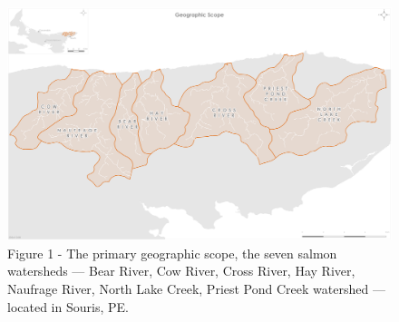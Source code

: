 \documentclass[
  letterpaper,
  DIV=11,
  numbers=noendperiod]{scrreprt}
\begin{document}
\begin{figure}

{\centering \includegraphics{content/images/GeographicScope.png}

}

\caption{Figure 1 - The primary geographic scope, the seven salmon
watersheds --- Bear River, Cow River, Cross River, Hay River, Naufrage
River, North Lake Creek, Priest Pond Creek watershed --- located in
Souris, PE.}

\end{figure}%
\end{document}

